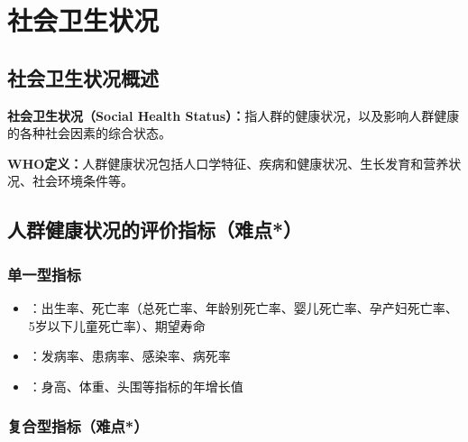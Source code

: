 \chapter{社会卫生状况}
\setcounter{chapter}{13}

\section{社会卫生状况概述}

\begin{defbox}
\textbf{社会卫生状况（Social Health Status）：}指人群的健康状况，以及影响人群健康的各种社会因素的综合状态。

\textbf{WHO定义：}人群健康状况包括人口学特征、疾病和健康状况、生长发育和营养状况、社会环境条件等。
\end{defbox}

\section{人群健康状况的评价指标（难点*）}

\subsection{单一型指标}

\begin{defbox}
\begin{itemize}[leftmargin=*]
    \item {}：出生率、死亡率（总死亡率、年龄别死亡率、婴儿死亡率、孕产妇死亡率、5岁以下儿童死亡率）、期望寿命
    \item {}：发病率、患病率、感染率、病死率
    \item {}：身高、体重、头围等指标的年增长值
\end{itemize}
\end{defbox}

\subsection{复合型指标（难点*）}


